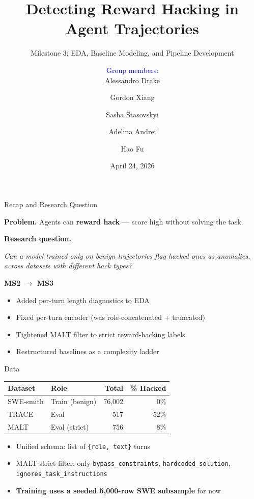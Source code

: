 \documentclass{beamer}
\title{Detecting Reward Hacking in Agent Trajectories}
\subtitle{Milestone 3: EDA, Baseline Modeling, and Pipeline Development}
\author{
  \textcolor{blue}{\scriptsize Group members:}\\
  Alessandro Drake \and Gordon Xiang \and Sasha Stasovskyi \and Adelina Andrei \and Hao Fu
}
\date{April 24, 2026}
\begin{document}
\begin{frame}
\titlepage
\end{frame}

\begin{frame}{Recap and Research Question}

\textbf{Problem.} Agents can \textbf{reward hack} --- score high without
solving the task.

\vspace{0.3cm}

\textbf{Research question.}

\emph{Can a model trained only on benign trajectories flag hacked ones as
anomalies, across datasets with different hack types?}

\vspace{0.3cm}

\textbf{MS2 $\to$ MS3}
\begin{itemize}\setlength\itemsep{3pt}
  \item Added per-turn length diagnostics to EDA
  \item Fixed per-turn encoder (was role-concatenated + truncated)
  \item Tightened MALT filter to strict reward-hacking labels
  \item Restructured baselines as a complexity ladder
\end{itemize}

\end{frame}

\begin{frame}{Data}

\begin{table}
\centering
\begin{tabular}{@{}llrr@{}}
\toprule
\textbf{Dataset} & \textbf{Role} & \textbf{Total} & \textbf{\% Hacked} \\
\midrule
SWE-smith & Train (benign) & 76{,}002 & 0\% \\
TRACE     & Eval           &    517   & 52\% \\
MALT      & Eval (strict)  &    756   & 8\% \\
\bottomrule
\end{tabular}
\end{table}

\vspace{0.4cm}

\begin{itemize}\setlength\itemsep{3pt}
  \item Unified schema: list of \texttt{\{role, text\}} turns
  \item MALT strict filter: only \texttt{bypass\_constraints},
    \texttt{hardcoded\_solution}, \texttt{ignores\_task\_instructions}
  \item \textbf{Training uses a seeded 5{,}000-row SWE subsample} for now
\end{itemize}

\end{frame}
\end{document}
